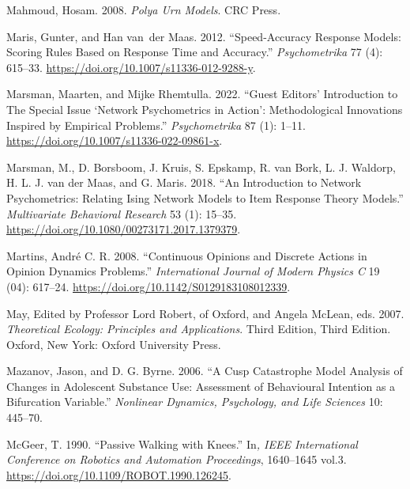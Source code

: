 \documentclass[
  a4paper,
  DIV=11,
  numbers=noendperiod,
  oneside]{scrreprt}
\newlength{\cslhangindent}
\newlength{\cslentryspacingunit} %
\newenvironment{CSLReferences}[2] %
 {%
  \setlength{\parindent}{0pt}
  \ifodd #1
  \let\oldpar\par
  \def\par{\hangindent=\cslhangindent\oldpar}
  \fi
  \setlength{\parskip}{#2\cslentryspacingunit}
 }%
 {}
\begin{document}
\begin{CSLReferences}{1}{0}
\leavevmode{}%
Mahmoud, Hosam. 2008. \emph{Polya {Urn Models}}. {CRC Press}.

\leavevmode{}%
Maris, Gunter, and Han van~der Maas. 2012. {``Speed-Accuracy Response
Models: {Scoring} Rules Based on Response Time and Accuracy.''}
\emph{Psychometrika} 77 (4): 615--33.
\url{https://doi.org/10.1007/s11336-012-9288-y}.

\leavevmode{}%
Marsman, Maarten, and Mijke Rhemtulla. 2022. {``Guest {Editors}'
{Introduction} to {The Special Issue} {`{Network Psychometrics} in
{Action}'}: {Methodological Innovations Inspired} by {Empirical
Problems}.''} \emph{Psychometrika} 87 (1): 1--11.
\url{https://doi.org/10.1007/s11336-022-09861-x}.

\leavevmode{}%
Marsman, M., D. Borsboom, J. Kruis, S. Epskamp, R. van Bork, L. J.
Waldorp, H. L. J. van der Maas, and G. Maris. 2018. {``An Introduction
to Network Psychometrics: Relating Ising Network Models to Item Response
Theory Models.''} \emph{Multivariate Behavioral Research} 53 (1):
15--35. \url{https://doi.org/10.1080/00273171.2017.1379379}.

\leavevmode{}%
Martins, André C. R. 2008. {``Continuous Opinions and Discrete Actions
in Opinion Dynamics Problems.''} \emph{International Journal of Modern
Physics C} 19 (04): 617--24.
\url{https://doi.org/10.1142/S0129183108012339}.

\leavevmode{}%
May, Edited by Professor Lord Robert, of Oxford, and Angela McLean, eds.
2007. \emph{Theoretical {Ecology}: {Principles} and {Applications}}.
Third Edition, Third Edition. {Oxford, New York}: {Oxford University
Press}.

\leavevmode{}%
Mazanov, Jason, and D. G. Byrne. 2006. {``A {Cusp Catastrophe Model
Analysis} of {Changes} in {Adolescent Substance Use}: {Assessment} of
{Behavioural Intention} as a {Bifurcation Variable}.''} \emph{Nonlinear
Dynamics, Psychology, and Life Sciences} 10: 445--70.

\leavevmode{}%
McGeer, T. 1990. {``Passive Walking with Knees.''} In\emph{, {IEEE
International Conference} on {Robotics} and {Automation Proceedings}},
1640--1645 vol.3. \url{https://doi.org/10.1109/ROBOT.1990.126245}.


\end{CSLReferences}
\end{document}

